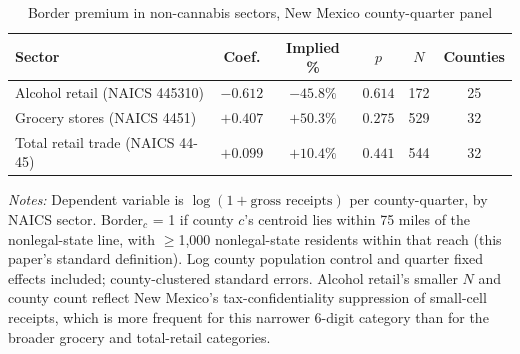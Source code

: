 \begin{table}[htbp]
\centering
\caption{Border premium in non-cannabis sectors, New Mexico county-quarter panel}
\label{tab:noncannabis_placebo}
\footnotesize
\begin{tabular}{lccccc}
\toprule
Sector & Coef. & Implied \% & $p$ & $N$ & Counties \\
\midrule
Alcohol retail (NAICS 445310) & $-0.612$ & $-45.8\%$ & $0.614$ & 172 & 25 \\
Grocery stores (NAICS 4451) & $+0.407$ & $+50.3\%$ & $0.275$ & 529 & 32 \\
Total retail trade (NAICS 44-45) & $+0.099$ & $+10.4\%$ & $0.441$ & 544 & 32 \\
\bottomrule
\end{tabular}
\begin{minipage}{0.98\textwidth}
\vspace{0.3em}
\footnotesize
\textit{Notes:} Dependent variable is $\log(1+\text{gross receipts})$ per county-quarter, by NAICS sector.
Border$_c$ = 1 if county $c$'s centroid lies within 75 miles of the nonlegal-state line, with $\geq$1,000
nonlegal-state residents within that reach (this paper's standard definition). Log county population control
and quarter fixed effects included; county-clustered standard errors. Alcohol retail's smaller $N$ and county
count reflect New Mexico's tax-confidentiality suppression of small-cell receipts, which is more frequent for
this narrower 6-digit category than for the broader grocery and total-retail categories.
\end{minipage}
\end{table}
